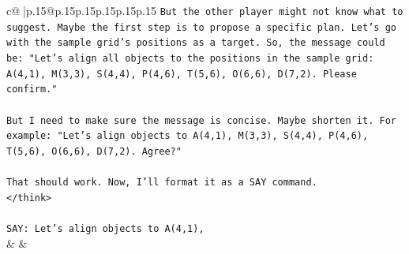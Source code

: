 \documentclass{article}
\begin{document}
{\begin{supertabular}{c@{$\;$}|p{.15\linewidth}@{}p{.15\linewidth}p{.15\linewidth}p{.15\linewidth}p{.15\linewidth}p{.15\linewidth}}
{{{\texttt{But the other player might not know what to suggest. Maybe the first step is to propose a specific plan. Let's go with the sample grid's positions as a target. So, the message could be: "Let's align all objects to the positions in the sample grid: A(4,1), M(3,3), S(4,4), P(4,6), T(5,6), O(6,6), D(7,2). Please confirm."} \\
\\ 
\texttt{But I need to make sure the message is concise. Maybe shorten it. For example: "Let's align objects to A(4,1), M(3,3), S(4,4), P(4,6), T(5,6), O(6,6), D(7,2). Agree?"} \\
\\ 
\texttt{That should work. Now, I'll format it as a SAY command.} \\
\texttt{</think>} \\
\\ 
\texttt{SAY: Let's align objects to A(4,1),} \\
            }
        }
    }
    & & \\ \\


\end{supertabular}}
\end{document}

